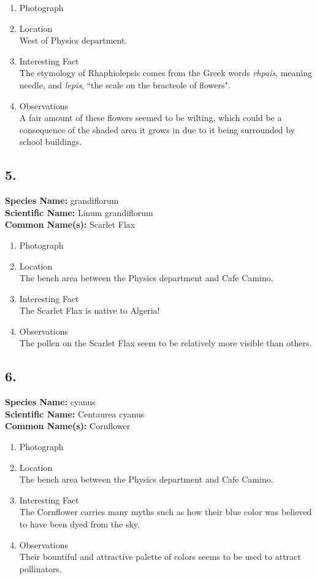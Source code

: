 \documentclass{article}
\begin{document}
\begin{enumerate}[label = \textbf{\arabic*)}]
	\item Photograph
	\item Location \\
		West of Physics department.
	\item Interesting Fact \\
		The etymology of Rhaphiolepsis comes from the Greek words \textit{rhpais}, meaning needle, and \textit{lepis}, ``the scale on the bracteole of flowers".
	\item Observations \\
		A fair amount of these flowers seemed to be wilting, which could be a consequence of the shaded area it grows in due to it being surrounded by school buildings.
\end{enumerate}

\subsection{5.}
\textbf{Species Name: } grandiflorum \\
\textbf{Scientific Name: } Linum grandiflorum \\
\textbf{Common Name(s): } Scarlet Flax

\begin{enumerate}[label = \textbf{\arabic*)}]
	\item Photograph
	\item Location \\
		The bench area between the Physics department and Cafe Camino.
	\item Interesting Fact \\
		The Scarlet Flax is native to Algeria!
	\item Observations \\
		The pollen on the Scarlet Flax seem to be relatively more visible than others.
\end{enumerate}

\subsection{6.}
\textbf{Species Name: } cyanus \\
\textbf{Scientific Name: } Centaurea cyanus \\
\textbf{Common Name(s): } Cornflower

\begin{enumerate}[label = \textbf{\arabic*)}]
	\item Photograph
	\item Location \\
		The bench area between the Physics department and Cafe Camino.
	\item Interesting Fact \\
		The Cornflower carries many myths such as how their blue color was believed to have been dyed from the sky.
	\item Observations \\
		Their bountiful and attractive palette of colors seems to be used to attract pollinators.
\end{enumerate}
\end{document}
